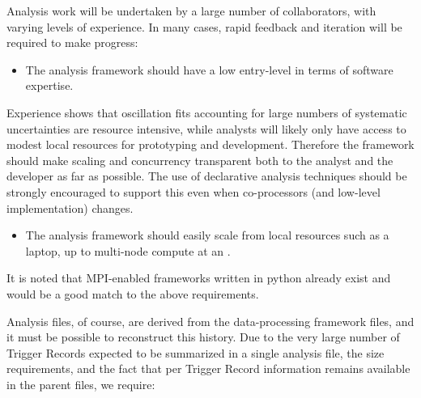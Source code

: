 \documentclass[../main-v1.tex]{subfiles}
\begin{document}





Analysis work will be undertaken by a large number of collaborators, with varying levels of experience. In many cases, rapid feedback and iteration will be required to make progress:

\begin{itemize}
\item The analysis framework should have a low entry-level in terms of software expertise.
\end{itemize}

Experience shows that oscillation fits accounting for large numbers of systematic uncertainties are resource intensive, while analysts will likely only have access to modest local resources for prototyping and development.  Therefore the framework should make scaling and concurrency transparent both to the analyst and the developer as far as possible.  The use of declarative analysis techniques should be strongly encouraged to support this even when co-processors (and low-level implementation) changes.

\begin{itemize}
\item The analysis framework should easily scale from local resources such as a laptop, up to multi-node compute at an .
\end{itemize}

It is noted that MPI-enabled frameworks written in python already exist and would be a good match to the above requirements.

Analysis files, of course, are derived from the data-processing framework files, and it must be possible to reconstruct this history. Due to the very large number of Trigger Records expected to be summarized in a single analysis file, the size requirements, and the fact that per Trigger Record information remains available in the parent files, we require:
\end{document}
